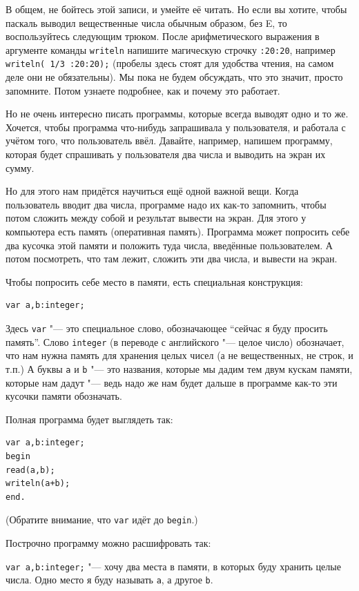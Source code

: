 В общем, не бойтесь этой записи, и умейте её читать. Но если вы хотите, чтобы паскаль выводил вещественные числа обычным образом, без E, то воспользуйтесь следующим трюком. После арифметического выражения в аргументе команды \verb`writeln` напишите магическую строчку \verb`:20:20`, например \verb`writeln( 1/3 :20:20);` (пробелы здесь стоят для удобства чтения, на самом деле они не обязательны). Мы пока не будем обсуждать, что это значит, просто запомните. Потом узнаете подробнее, как и почему это работает.


Но не очень интересно писать программы, которые всегда выводят одно и то же. Хочется, чтобы программа что-нибудь запрашивала у пользователя, и работала с учётом того, что пользователь ввёл. Давайте, например, напишем программу, которая будет спрашивать у пользователя два числа и выводить на экран их сумму.

Но для этого нам придётся научиться ещё одной важной вещи. Когда пользователь вводит два числа, программе надо их как-то запомнить, чтобы потом сложить между собой и результат вывести на экран. Для этого у компьютера есть память (оперативная память). Программа может попросить себе два кусочка этой памяти и положить туда числа, введённые пользователем. А потом посмотреть, что там лежит, сложить эти два числа, и вывести на экран.

Чтобы попросить себе место в памяти, есть специальная конструкция:
\begin{verbatim}
var a,b:integer;
\end{verbatim}
Здесь \verb`var` "--- это специальное слово, обозначающее ``сейчас я буду просить память''. Слово \verb`integer` (в переводе с английского "--- целое число) обозначает, что нам нужна память для хранения целых чисел (а не вещественных, не строк, и т.п.) А буквы \verb`a` и \verb`b` "--- это названия, которые мы дадим тем двум кускам памяти, которые нам дадут "--- ведь надо же нам будет дальше в программе как-то эти кусочки памяти обозначать.

Полная программа будет выглядеть так:
\begin{verbatim}
var a,b:integer;
begin
read(a,b);
writeln(a+b);
end.
\end{verbatim}
(Обратите внимание, что \verb`var` идёт до \verb`begin`.)

Построчно программу можно расшифровать так:

\verb`var a,b:integer;` "--- хочу два места в памяти, в которых буду хранить целые числа. Одно место я буду называть \verb`a`, а другое \verb`b`.

